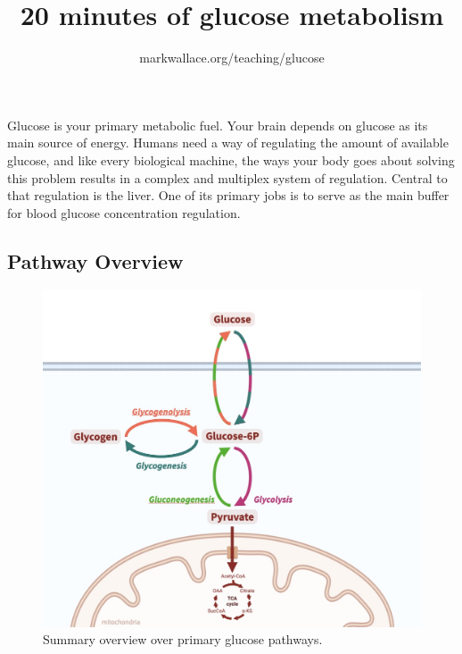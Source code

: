 \documentclass[]{tufte-handout}
\title{20 minutes of glucose metabolism}
\author{markwallace.org/teaching/glucose}
\date{}
\begin{document}
\maketitle


\setlength{\parindent}{0pt}



Glucose is your primary metabolic fuel. Your brain depends on glucose as its main source of energy. Humans need a way of regulating the amount of available glucose, and like every biological machine, the ways your body goes about solving this problem results in a complex and multiplex system of regulation. Central to that regulation is the liver. One of its primary jobs is to serve as the main buffer for blood glucose concentration regulation.

\subsection{Pathway Overview}\label{pathway-overview}

\begin{figure}

{\centering \includegraphics{img/glucosepathwayssummary} 

}

\caption[Summary overview over primary glucose pathways]{Summary overview over primary glucose pathways.}\label{fig:unnamed-chunk-1}
\end{figure}
\end{document}
